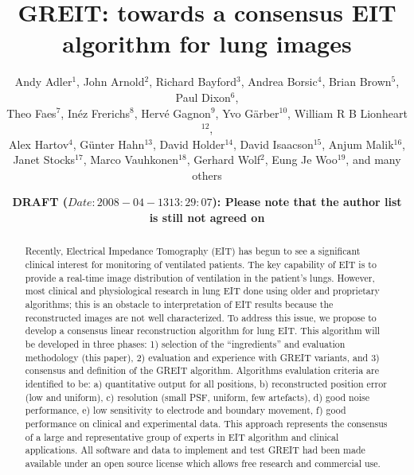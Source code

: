 \documentclass[letterpaper,twocolumn,11pt]{article}
\begin{document}
\title{\bf GREIT: towards a consensus EIT algorithm for lung images}

\author{Andy Adler$^{1}$,
        John Arnold$^{2}$,
        Richard Bayford$^{3}$,
        Andrea Borsic$^{4}$,
        Brian Brown$^{5}$,
        Paul Dixon$^{6}$,
\\
        Theo Faes$^{7}$,
        In\'ez Frerichs$^{8}$,
        Herv\'e Gagnon$^{9}$,
        Yvo G\"arber$^{10}$,
        William R B Lionheart$^{12}$,
\\
        Alex Hartov$^{4}$,
        G\"unter Hahn$^{13}$,
        David Holder$^{14}$,
        David Isaacson$^{15}$,
        Anjum Malik$^{16}$,
\\
        Janet Stocks$^{17}$,
        Marco Vauhkonen$^{18}$,
        Gerhard Wolf$^{2}$,
        Eung Je Woo$^{19}$,
        and many others%
       }

\date{\bf DRAFT ($Date: 2008-04-13 13:29:07 $): Please note that the
           author list is still not agreed on}
\maketitle



\begin{abstract}
Recently, Electrical Impedance Tomography (EIT) has begun to see a
significant clinical interest for monitoring of
ventilated patients.  The key capability of EIT is to
provide a real-time image distribution of ventilation in
the patient's lungs.
However, most clinical and physiological research in lung EIT
done using older and proprietary algorithms; this is
an obstacle to interpretation of EIT results because the
reconstructed images are not well characterized.
To address this issue, we propose to develop a 
consensus linear reconstruction algorithm for lung EIT.
This algorithm will be developed in three phases:
1) selection of the ``ingredients'' and evaluation 
methodology (this paper),
2) evaluation and experience with GREIT variants, and
3) consensus and definition of the GREIT algorithm.
Algorithms evalulation criteria are identified to be:
a) quantitative output for all positions,
b) reconstructed position error (low and uniform),
c) resolution (small PSF, uniform, few artefacts),
d) good noise performance,
e) low sensitivity to electrode and boundary movement,
f) good performance on clinical and experimental data.
This approach represents the consensus of a large and representative
group of experts in EIT algorithm and clinical applications.
All software and data to implement and test GREIT had been
made available under an open source license which allows free
research and commercial use.
\end{abstract}
\end{document}
